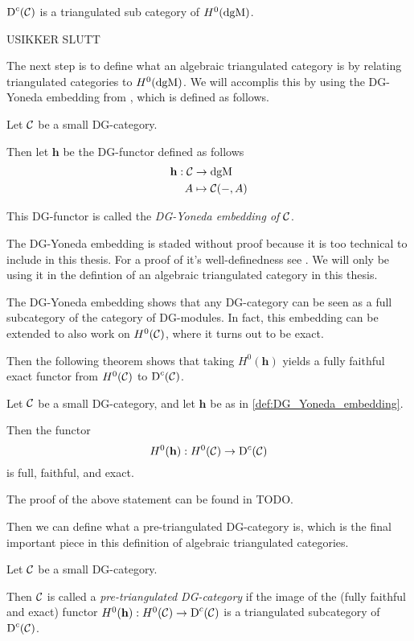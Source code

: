 \begin{proposition}
    \( \operatorname{D}^c({\mathcal{C}}) \) is a triangulated sub category of \( H^0(\operatorname{dgM}) \).
\end{proposition}

USIKKER SLUTT

The next step is to define what an algebraic triangulated category is by relating triangulated categories to \( H^0(\operatorname{dgM}) \). We will accomplis this by using the DG-Yoneda embedding from \cite[Corollary 6.3.6]{Borceux_1994}, which is defined as follows.
\begin{definition}
    \label{def:DG_Yoneda_embedding}
    Let \( {\mathcal{C}} \) be a small DG-category.
    
    Then let \( \mathbf{h} \) be the DG-functor defined as follows
    \begin{align*}
        \mathbf{h}: {\mathcal{C}} &\to \operatorname{dgM} \\
        A &\mapsto {\mathcal{C}}(-, A)
    \end{align*}

    This DG-functor is called the \emph{DG-Yoneda embedding of \( {\mathcal{C}} \)}.
\end{definition}

The DG-Yoneda embedding is staded without proof because it is too technical to include in this thesis. For a proof of it's well-definedness see \cite[Corollary 6.3.6]{Borceux_1994}. We will only be using it in the defintion of an algebraic triangulated category in this thesis.

The DG-Yoneda embedding shows that any DG-category can be seen as a full subcategory of the category of DG-modules. In fact, this embedding can be extended to also work on \( H^0({\mathcal{C}}) \), where it turns out to be exact.

Then the following theorem shows that taking \( H^0(\mathbf{h}) \) yields a fully faithful exact functor from \( H^0({\mathcal{C}}) \) to \( \operatorname{D}^c({\mathcal{C}}) \).

\begin{theorem}
    Let \( {\mathcal{C}} \) be a small DG-category, and let \( \mathbf{h} \) be as in \autoref{def:DG_Yoneda_embedding}.

    Then the functor
    \[
        H^0(\mathbf{h}): H^0({\mathcal{C}}) \to \operatorname{D}^c({\mathcal{C}})
    \]
    is full, faithful, and exact.
\end{theorem}
The proof of the above statement can be found in TODO.

Then we can define what a pre-triangulated DG-category is, which is the final important piece in this definition of algebraic triangulated categories.
\begin{definition}
    Let \( {\mathcal{C}} \) be a small DG-category.

    Then \( {\mathcal{C}} \) is called a \emph{pre-triangulated DG-category} if the image of the (fully faithful and exact) functor \( H^0(\mathbf{h}): H^0({\mathcal{C}}) \to \operatorname{D}^c({\mathcal{C}}) \) is a triangulated subcategory of \( \operatorname{D}^c({\mathcal{C}}) \).
\end{definition}

